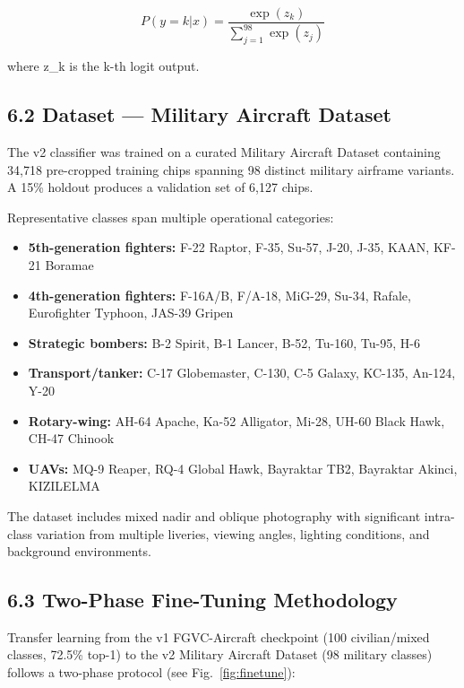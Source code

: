 \documentclass[11pt,a4paper]{article}
\providecommand{\tightlist}{\setlength{\itemsep}{0pt}\setlength{\parskip}{0pt}}
\begin{document}
\[P(y = k | x) = \frac{\exp(z_k)}{\sum_{j=1}^{98} \exp(z_j)} \tag{5}\]

where z\_k is the k-th logit output.

\hypertarget{dataset-military-aircraft-dataset}{%
\subsection{6.2 Dataset --- Military Aircraft Dataset}\label{dataset-military-aircraft-dataset}}

The v2 classifier was trained on a curated Military Aircraft Dataset containing 34,718 pre-cropped training chips spanning 98 distinct military airframe variants. A 15\% holdout produces a validation set of 6,127 chips.

Representative classes span multiple operational categories:

\begin{itemize}
\tightlist
\item
  \textbf{5th-generation fighters:} F-22 Raptor, F-35, Su-57, J-20, J-35, KAAN, KF-21 Boramae
\item
  \textbf{4th-generation fighters:} F-16A/B, F/A-18, MiG-29, Su-34, Rafale, Eurofighter Typhoon, JAS-39 Gripen
\item
  \textbf{Strategic bombers:} B-2 Spirit, B-1 Lancer, B-52, Tu-160, Tu-95, H-6
\item
  \textbf{Transport/tanker:} C-17 Globemaster, C-130, C-5 Galaxy, KC-135, An-124, Y-20
\item
  \textbf{Rotary-wing:} AH-64 Apache, Ka-52 Alligator, Mi-28, UH-60 Black Hawk, CH-47 Chinook
\item
  \textbf{UAVs:} MQ-9 Reaper, RQ-4 Global Hawk, Bayraktar TB2, Bayraktar Akinci, KIZILELMA
\end{itemize}

The dataset includes mixed nadir and oblique photography with significant intra-class variation from multiple liveries, viewing angles, lighting conditions, and background environments.

\hypertarget{two-phase-fine-tuning-methodology}{%
\subsection{6.3 Two-Phase Fine-Tuning Methodology}\label{two-phase-fine-tuning-methodology}}

Transfer learning from the v1 FGVC-Aircraft checkpoint (100 civilian/mixed classes, 72.5\% top-1) to the v2 Military Aircraft Dataset (98 military classes) follows a two-phase protocol (see Fig.~\ref{fig:finetune}):
\end{document}
